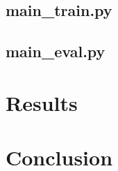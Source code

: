 \subsection{main\_train.py}



\subsection{main\_eval.py}





\section{Results}




\section{Conclusion}





